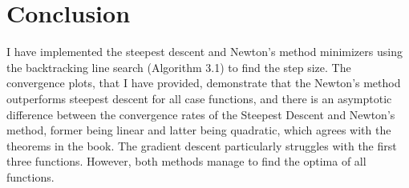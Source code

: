 \documentclass[a4paper]{article}
\begin{document}
\section{Conclusion}
I have implemented the steepest descent and Newton's method minimizers using the
backtracking line search (Algorithm 3.1) to find the step size.
The convergence plots, that I have provided, demonstrate that
the Newton's method outperforms steepest descent for all case functions,
and there is an asymptotic difference between the convergence rates of the
Steepest Descent and Newton's method, former being linear and latter being quadratic,
which agrees with the theorems in the book.
The gradient descent particularly struggles with the first three functions.
However, both methods manage to find the optima of all functions.
\end{document}
